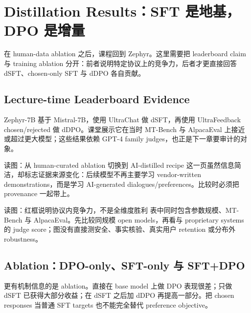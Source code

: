 \section{Distillation Results：SFT 是地基，DPO 是增量}

在 human-data ablation 之后，课程回到 Zephyr。这里需要把 leaderboard claim 与 training ablation 分开：前者说明特定协议上的竞争力，后者才更直接回答 dSFT、chosen-only SFT 与 dDPO 各自贡献。

\subsection{Lecture-time Leaderboard Evidence}

Zephyr-7B 基于 Mistral-7B，使用 UltraChat 做 dSFT，再使用 UltraFeedback chosen/rejected 做 dDPO。课堂展示它在当时 MT-Bench 与 AlpacaEval 上接近或超过更大模型；这些结果依赖 GPT-4 family judges，也正是下一章要审计的对象。


\begin{knowledgebox}{读图：从 human-curated ablation 切换到 AI-distilled recipe}
这一页虽然信息简洁，却标志证据来源变化：后续模型不再主要学习 vendor-written demonstrations，而是学习 AI-generated dialogues/preferences。比较时必须把 provenance 一起带上。
\end{knowledgebox}


\begin{knowledgebox}{读图：红框说明协议内竞争力，不是全维度胜利}
表中同时包含参数规模、MT-Bench 与 AlpacaEval。先比较同规模 open models，再看与 proprietary systems 的 judge score；图没有直接测安全、事实核验、真实用户 retention 或分布外 robustness。
\end{knowledgebox}

\subsection{Ablation：DPO-only、SFT-only 与 SFT+DPO}

更有机制信息的是 ablation。直接在 base model 上做 DPO 表现很差；只做 dSFT 已获得大部分收益；在 dSFT 之后加 dDPO 再提高一部分。把 chosen responses 当普通 SFT targets 也不能完全替代 preference objective。


